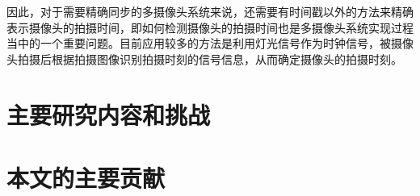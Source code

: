 因此，对于需要精确同步的多摄像头系统来说，还需要有时间戳以外的方法来精确表示摄像头的拍摄时间，即如何检测摄像头的拍摄时间也是多摄像头系统实现过程当中的一个重要问题。目前应用较多的方法是利用灯光信号作为时钟信号，被摄像头拍摄后根据拍摄图像识别拍摄时刻的信号信息，从而确定摄像头的拍摄时刻。

\section{主要研究内容和挑战}


\section{本文的主要贡献}








































